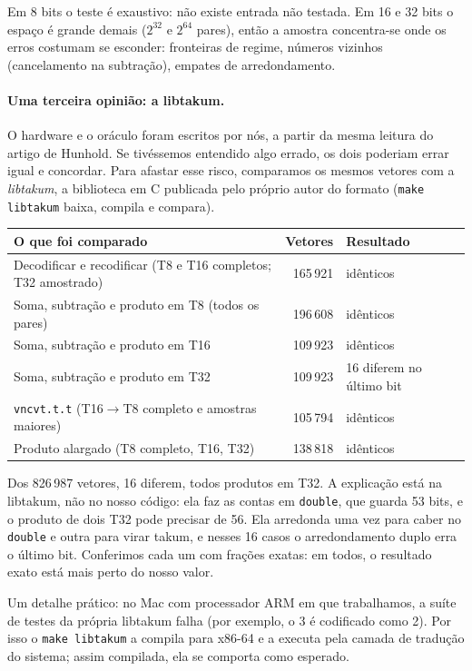 \documentclass[11pt,a4paper]{article}
\newcommand{\code}[1]{\texttt{#1}}
\begin{document}
Em 8 bits o teste é exaustivo: não existe entrada não testada. Em 16 e 32 bits o espaço é grande demais
($2^{32}$ e $2^{64}$ pares), então a amostra concentra-se onde os erros costumam se esconder: fronteiras
de regime, números vizinhos (cancelamento na subtração), empates de arredondamento.

\paragraph{Uma terceira opinião: a libtakum.} O hardware e o oráculo foram escritos por nós, a partir da
mesma leitura do artigo de Hunhold. Se tivéssemos entendido algo errado, os dois poderiam errar igual e
concordar. Para afastar esse risco, comparamos os mesmos vetores com a \emph{libtakum}, a biblioteca em C
publicada pelo próprio autor do formato (\code{make libtakum} baixa, compila e compara).

\begin{center}
\begin{tabularx}{\linewidth}{Xrl}
\toprule
O que foi comparado & Vetores & Resultado \\
\midrule
Decodificar e recodificar (T8 e T16 completos; T32 amostrado) & 165\,921 & idênticos \\
Soma, subtração e produto em T8 (todos os pares) & 196\,608 & idênticos \\
Soma, subtração e produto em T16 & 109\,923 & idênticos \\
Soma, subtração e produto em T32 & 109\,923 & 16 diferem no último bit \\
\code{vncvt.t.t} (T16$\to$T8 completo e amostras maiores) & 105\,794 & idênticos \\
Produto alargado (T8 completo, T16, T32) & 138\,818 & idênticos \\
\bottomrule
\end{tabularx}
\end{center}

Dos 826\,987 vetores, 16 diferem, todos produtos em T32. A explicação está na libtakum, não no nosso
código: ela faz as contas em \code{double}, que guarda 53 bits, e o produto de dois T32 pode precisar de
56. Ela arredonda uma vez para caber no \code{double} e outra para virar takum, e nesses 16 casos o
arredondamento duplo erra o último bit. Conferimos cada um com frações exatas: em todos, o resultado
exato está mais perto do nosso valor.

Um detalhe prático: no Mac com processador ARM em que trabalhamos, a suíte de testes da própria libtakum
falha (por exemplo, o 3 é codificado como 2). Por isso o \code{make libtakum} a compila para x86-64 e a
executa pela camada de tradução do sistema; assim compilada, ela se comporta como esperado.
\end{document}

